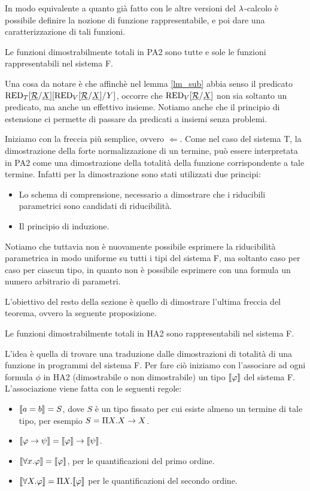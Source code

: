 \documentclass[]{marticle}
\begin{document}
In modo equivalente a quanto gi\`a fatto con le altre versioni del $\lambda$-calcolo
\`e possibile definire la nozione di funzione rappresentabile, e poi dare una
caratterizzazione di tali funzioni.

\begin{block}[Teorema]
    Le funzioni dimostrabilmente totali in PA2 sono tutte e sole le
    funzioni rappresentabili nel sistema F.
\end{block}

Una cosa da notare \`e che affinch\`e nel lemma \ref{lm_sub} abbia senso il
predicato $\text{RED}_{T}[\underline{\mathcal{R}}/\underline{X}] [\text{RED}_{V}[\underline{\mathcal{R}}/\underline{X}]/Y]$, occorre che $\text{RED}_{V}[\underline{\mathcal{R}}/\underline{X}]$
non sia soltanto un predicato, ma anche un effettivo insieme.  Notiamo anche che
il principio di estensione ci permette di passare da predicati a insiemi senza
problemi.


Iniziamo con la freccia pi\`u semplice, ovvero $\Leftarrow$. Come nel caso del
sistema T, la dimostrazione della forte normalizzazione di un termine, pu\`o
essere interpretata in PA2 come una dimostrazione della totalit\`a della
funzione corrispondente a tale termine. Infatti per la dimostrazione sono stati
utilizzati due principi:
\begin{itemize}
    \item Lo schema di comprensione, necessario a dimostrare che i riducibili
        parametrici sono candidati di riducibilit\`a. 
    \item Il principio di induzione.
\end{itemize}

Notiamo che tuttavia non \`e nuovamente possibile esprimere la riducibilit\`a
parametrica in modo uniforme su tutti i tipi del sistema F, ma soltanto caso per
caso per ciascun tipo, in quanto non \`e possibile esprimere con una formula un
numero arbitrario di parametri.

L'obiettivo del resto della sezione \`e quello di dimostrare l'ultima freccia
del teorema, ovvero la seguente proposizione.
\begin{block}[Proposizione]
    Le funzioni dimostrabilmente totali in HA2 sono rappresentabili nel sistema
    F.
\end{block}

L'idea \`e quella di trovare una traduzione dalle dimostrazioni di totalit\`a di
una funzione in programmi del sistema F. Per fare ci\`o iniziamo con
l'associare ad ogni formula $\phi$ in HA2 (dimostrabile o non dimostrabile) un
tipo $\llbracket \varphi \rrbracket$ del sistema F. L'associazione viene fatta con le seguenti
regole:
\begin{itemize}
    \item $\llbracket a=b \rrbracket = S$, dove $S$ \`e un tipo fissato per cui esiste almeno un
        termine di tale tipo, per esempio $S=\Pi X.X\rightarrow X$.
    \item $\llbracket \varphi\rightarrow\psi \rrbracket=\llbracket \varphi \rrbracket\rightarrow\llbracket \psi \rrbracket$.
    \item $\llbracket \forall x.\varphi \rrbracket=\llbracket \varphi \rrbracket$, per le quantificazioni del primo
        ordine.
    \item $\llbracket \forall X.\varphi \rrbracket=\Pi X.\llbracket \varphi \rrbracket$ per le quantificazioni del secondo
        ordine.
\end{itemize}
\end{document}
